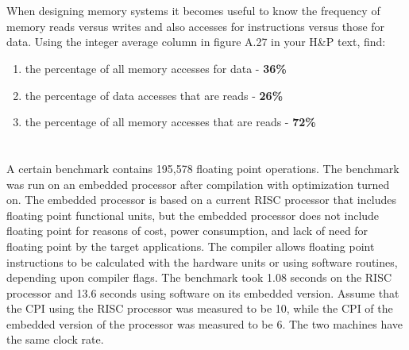 \documentclass{article}
\begin{document}
\section{}
When designing memory systems it becomes useful to know the frequency of memory reads versus writes and also accesses for instructions versus those for data. Using the integer average column in figure A.27 in your H\&P text, find:

\begin{enumerate}[label=\alph*]
	\item the percentage of all memory accesses for data - \textbf{36\%}
	\item the percentage of data accesses that are reads - \textbf{26\%}
	\item the percentage of all memory accesses that are reads - \textbf{72\%}
\end{enumerate}



\pagebreak
\section{}
A certain benchmark contains 195,578 floating point operations. The benchmark was run on an embedded processor after compilation with optimization turned on. The embedded processor is based on a current RISC processor that includes floating point functional units, but the embedded processor does not include floating point for reasons of cost, power consumption, and lack of need for floating point by the target applications. The compiler allows floating point instructions to be calculated with the hardware units or using software routines, depending upon compiler flags. The benchmark took 1.08 seconds on the RISC processor and 13.6 seconds using software on its embedded version. Assume that the CPI using the RISC processor was measured to be 10, while the CPI of the embedded version of the processor was measured to be 6. The two machines have the same clock rate.

\vspace{5mm} 
\end{document}
